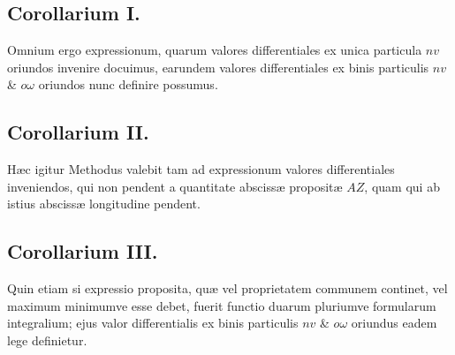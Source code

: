 \subsection*{Corollarium I.}
Omnium ergo expressionum, quarum valores differentiales ex unica particula $nv$ oriundos invenire docuimus, earundem
valores differentiales ex binis particulis $nv$ \& $o\omega$ oriundos nunc definire possumus.

\subsection*{Corollarium II.}
Hæc igitur Methodus valebit tam ad expressionum valores differentiales inveniendos, qui non pendent a quantitate abscissæ propositæ $AZ$, quam qui ab istius abscissæ longitudine pendent.

\subsection*{Corollarium III.}
Quin etiam si expressio proposita, quæ vel proprietatem communem continet, vel maximum minimumve esse debet, fuerit functio duarum pluriumve formularum integralium; ejus valor differentialis ex binis particulis $nv$ \& $o\omega$ oriundus eadem lege definietur.

